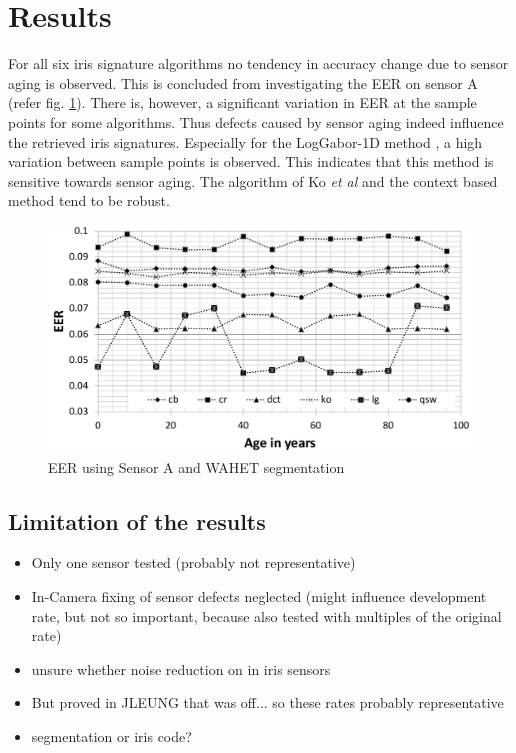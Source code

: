 \documentclass[10pt,twocolumn,letterpaper]{article}
\begin{document}
 \section{Results}
 \label{results}
 For all six iris signature algorithms no tendency in accuracy change due to sensor aging is observed. This is concluded from investigating the EER on sensor A (refer fig. \ref{fig:sensor1}). There is, however, a significant variation in EER at the sample points for some algorithms. Thus defects caused by sensor aging indeed influence the retrieved iris signatures. Especially for the LogGabor-1D method  \cite{lg}, a high variation between sample points is observed. This indicates that this method is sensitive towards sensor aging. The algorithm of Ko \emph{et al} \cite{ko} and the context based method \cite{cb} tend to be robust.
 
 \begin{figure}[h]
  \centering
  \includegraphics[width=\linewidth]{img/sensor1.png}
  \caption{EER using Sensor A and WAHET segmentation }
  \label{fig:sensor1}
\end{figure}
 
 
 \subsection{Limitation of the results}
 \begin{itemize}
  \item Only one sensor tested (probably not representative)
  \item In-Camera fixing of sensor defects neglected (might influence development rate, but not so important, because also tested with multiples of the original rate)
  \item unsure whether noise reduction on in iris sensors
  \item But proved in JLEUNG that was off... so these rates probably representative
  \item segmentation or iris code?
 \end{itemize}
 
\end{document}
